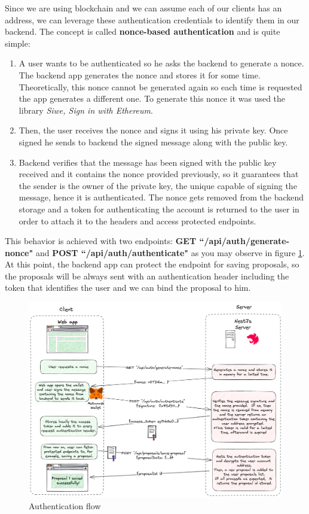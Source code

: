 {{Since we are using blockchain and we can assume each of our clients has an address, we can leverage these authentication credentials to identify them in our backend. The concept is called \textbf{nonce-based authentication} and is quite simple:
\begin{enumerate}
    \item A user wants to be authenticated so he asks the backend to generate a \gls{nonce}. The backend app generates the nonce and stores it for some time. Theoretically, this nonce cannot be generated again so each time is requested the app generates a different one. To generate this nonce it was used the library \textit{Siwe, Sign in with Ethereum}\cite{how-siwe}.
    \item Then, the user receives the nonce and signs it using his private key. Once signed he sends to backend the signed message along with the public key.
    \item Backend verifies that the message has been signed with the public key received and it contains the nonce provided previously, so it guarantees that the sender is the owner of the private key, the unique capable of signing the message, hence it is authenticated. The nonce gets removed from the backend storage and a token for authenticating the account is returned to the user in order to attach it to the headers and access protected endpoints.
\end{enumerate}
This behavior is achieved with two endpoints: \textbf{GET ``/api/auth/generate-nonce"} and \textbf{POST ``/api/auth/authenticate"} as you may observe in figure \ref{fig:auth-flow}. At this point, the backend app can protect the endpoint for saving proposals, so the proposals will be always sent with an authentication header including the token that identifies the user and we can bind the proposal to him.

\begin{figure}[H]
\centering
\includegraphics[width=14cm]{img/project-development/nonce.png}
\caption[Authentication flow]{\footnotesize{Authentication flow}}
\label{fig:auth-flow}
\end{figure}

}}
